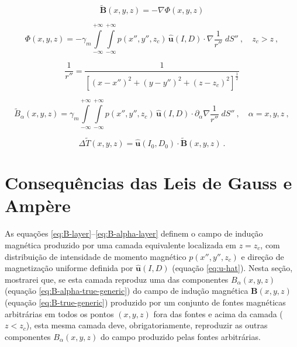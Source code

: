 \begin{equation}
\tilde{\mathbf{B}}(x, y, z) = - \nabla \Phi(x, y, z)
\label{eq:B-layer}
\end{equation}

\begin{equation}
\Phi(x, y, z) = - \gamma_{m} \int\limits_{-\infty}^{+\infty}\int\limits_{-\infty}^{+\infty} 
p(x'', y'', z_{c}) \, \hat{\mathbf{u}}(I, D) \cdot \nabla \frac{1}{r''} \; dS'' \: , \quad z_{c} > z \: ,
\label{eq:Phi-potential}
\end{equation}

\begin{equation}
\frac{1}{r''} = \frac{1}{\left[ (x - x'')^{2} + (y - y'')^{2} + (z - z_{c})^{2} \right]^{\frac{1}{2}}}
\label{eq:inv-r''}
\end{equation}

\begin{equation}
\tilde{B}_{\alpha}(x, y, z) = \gamma_{m} \int\limits_{-\infty}^{+\infty}\int\limits_{-\infty}^{+\infty} 
p(x'', y'', z_{c}) \, \hat{\mathbf{u}}(I, D) \cdot \partial_{\alpha} \nabla \frac{1}{r''} \; dS'' 
\: , \quad \alpha = x, y, z \: ,
\label{eq:B-alpha-layer}
\end{equation}

\begin{equation}
\Delta\tilde{T}(x, y, z) = \hat{\mathbf{u}}(I_{0}, D_{0}) \cdot \tilde{\mathbf{B}}(x, y, z) \: .
\label{eq:Delta-T-layer}
\end{equation}


\section{Consequências das Leis de Gauss e Amp{\`e}re}
\label{sec:Gauss-Ampere}

As equações \ref{eq:B-layer}--\ref{eq:B-alpha-layer} definem o campo de indução 
magnética produzido por uma camada equivalente localizada em $z = z_{c}$,
com distribuição de intensidade de momento magnético 
$p(x'', y'', z_{c})$ e direção de magnetização uniforme definida por 
$\hat{\mathbf{u}}(I, D)$ (equação \ref{eq:u-hat}). Nesta seção, mostrarei que, 
se esta camada reproduz uma das componentes $B_{\alpha}(x, y, z)$ (equação \ref{eq:B-alpha-true-generic})
do campo de indução magnética $\mathbf{B}(x, y, z)$ (equação \ref{eq:B-true-generic}) 
produzido por um conjunto de fontes magnéticas arbitrárias em todos os pontos 
$(x, y, z)$ fora das fontes e acima da camada ($z < z_{c}$), esta mesma camada deve, 
obrigatoriamente, reproduzir as outras componentes $B_{\alpha}(x, y, z)$ do campo 
produzido pelas fontes arbitrárias.

